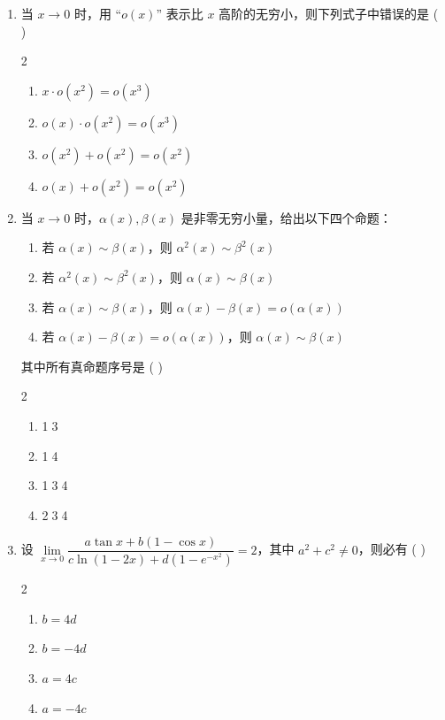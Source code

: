 \begin{enumerate}[label=\textbf{\arabic*.}, itemsep=4.5cm]
    \item 当 $x \to 0$ 时，用 “$o(x)$” 表示比 $x$ 高阶的无穷小，则下列式子中错误的是 ( \quad )
    \begin{multicols}{2}
    \begin{enumerate}[label=(\Alph*)]
        \item $x \cdot o(x^2) = o(x^3)$
        \item $o(x) \cdot o(x^2) = o(x^3)$
        \item $o(x^2) + o(x^2) = o(x^2)$
        \item $o(x) + o(x^2) = o(x^2)$
    \end{enumerate}
    \end{multicols}

    \item 当 $x \to 0$ 时，$\alpha(x), \beta(x)$ 是非零无穷小量，给出以下四个命题：
    \begin{enumerate}[label=\textcircled{\small\arabic*}]
        \item 若 $\alpha(x) \sim \beta(x)$，则 $\alpha^2(x) \sim \beta^2(x)$
        \item 若 $\alpha^2(x) \sim \beta^2(x)$，则 $\alpha(x) \sim \beta(x)$
        \item 若 $\alpha(x) \sim \beta(x)$，则 $\alpha(x) - \beta(x) = o(\alpha(x))$
        \item 若 $\alpha(x) - \beta(x) = o(\alpha(x))$，则 $\alpha(x) \sim \beta(x)$
    \end{enumerate}
    其中所有真命题序号是 ( \quad )
    \begin{multicols}{2}
    \begin{enumerate}[label=(\Alph*)]
        \item \textcircled{1}\textcircled{3}
        \item \textcircled{1}\textcircled{4}
        \item \textcircled{1}\textcircled{3}\textcircled{4}
        \item \textcircled{2}\textcircled{3}\textcircled{4}
    \end{enumerate}
    \end{multicols}

    \item 设 $\lim\limits_{x \to 0} \dfrac{a \tan x + b(1 - \cos x)}{c \ln(1 - 2x) + d(1 - e^{-x^2})} = 2$，其中 $a^2 + c^2 \ne 0$，则必有 ( \quad )
    \begin{multicols}{2}
    \begin{enumerate}[label=(\Alph*)]
        \item $b = 4d$
        \item $b = -4d$
        \item $a = 4c$
        \item $a = -4c$
    \end{enumerate}
    \end{multicols}
\end{enumerate}

